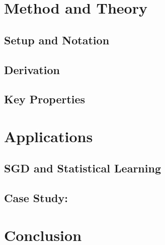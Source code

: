 \documentclass{article}
\begin{document}
\section{Method and Theory}

\subsection{Setup and Notation}

\subsection{Derivation}

\cite{bottou2010large}
\cite{bottou2012stochastic}
\cite{boyd2004convex}
\cite{zinkevich2010parallelized}
\cite{dal2015calibrating}
\subsection{Key Properties}

\section{Applications}

\subsection{SGD and Statistical Learning}

\subsection{Case Study: }

\section{Conclusion}

\printbibliography
\end{document}
